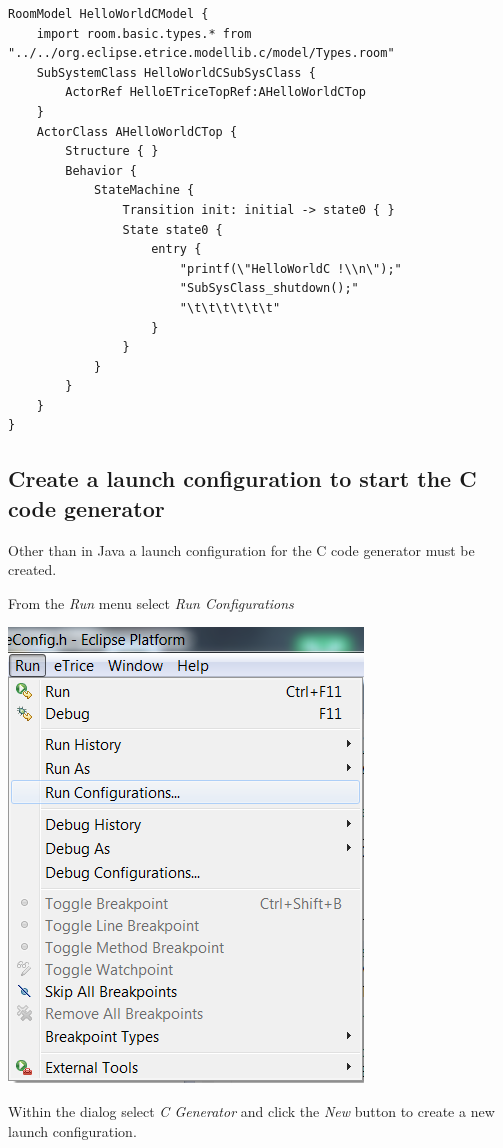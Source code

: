 \begin{verbatim} 
RoomModel HelloWorldCModel {
	import room.basic.types.* from "../../org.eclipse.etrice.modellib.c/model/Types.room"
	SubSystemClass HelloWorldCSubSysClass {
		ActorRef HelloETriceTopRef:AHelloWorldCTop 
	}
	ActorClass AHelloWorldCTop {
		Structure { }
		Behavior {
			StateMachine {
				Transition init: initial -> state0 { }
				State state0 {
					entry {
						"printf(\"HelloWorldC !\\n\");"
						"SubSysClass_shutdown();"
						"\t\t\t\t\t\t"
					}
				}
			}
		}
	}	
}
\end{verbatim}

\subsection{Create a launch configuration to start the C code generator}

Other than in Java a launch configuration for the C code generator must be created.

From the \textit{Run} menu select \textit{Run Configurations}

\includegraphics{images/016-HelloWorldC06.png}

Within the dialog select \textit{\eTrice{} C Generator} and click the \textit{New} button to create a new 
launch configuration.

